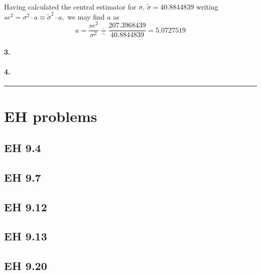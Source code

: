 \documentclass[
]{article}
\begin{document}
Having calculated the central estimator for
\(\sigma,\,\tilde\sigma=40.8844839\) writing
\(se^2=\sigma^2\cdot a\approx\tilde\sigma^2\cdot a,\) we may find \(a\)
as \[
a=\frac{se^2}{\sigma^2}\underset{\sim}{\overset{\cdot}{=}}\frac{207.3968439}{40.8844839}=5.0727519
\]

\hypertarget{section-97}{%
\paragraph{\texorpdfstring{\textbf{3.}}{3.}}\label{section-97}}

\hypertarget{section-98}{%
\paragraph{\texorpdfstring{\textbf{4.}}{4.}}\label{section-98}}

\begin{center}\rule{0.5\linewidth}{0.5pt}\end{center}

\hypertarget{eh-problems}{%
\section{EH problems}\label{eh-problems}}

\hypertarget{eh-9.4}{%
\subsection{EH 9.4}\label{eh-9.4}}

\hypertarget{eh-9.7}{%
\subsection{EH 9.7}\label{eh-9.7}}

\hypertarget{eh-9.12}{%
\subsection{EH 9.12}\label{eh-9.12}}

\hypertarget{eh-9.13}{%
\subsection{EH 9.13}\label{eh-9.13}}

\hypertarget{eh-9.20}{%
\subsection{EH 9.20}\label{eh-9.20}}
\end{document}
